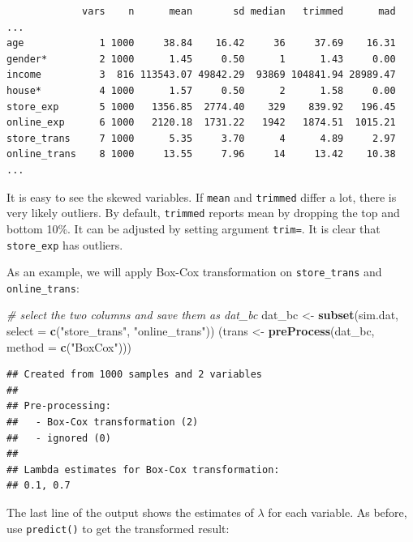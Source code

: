 \documentclass[12pt,]{krantz}
\makeatletter
\newenvironment{Shaded}{\begin{snugshade}}{\end{snugshade}}
\newcommand{\CommentTok}[1]{\textcolor[rgb]{0.37,0.37,0.37}{\textit{#1}}}
\newcommand{\DataTypeTok}[1]{\textcolor[rgb]{0.27,0.27,0.27}{#1}}
\newcommand{\KeywordTok}[1]{\textcolor[rgb]{0.27,0.27,0.27}{\textbf{#1}}}
\newcommand{\NormalTok}[1]{#1}
\newcommand{\StringTok}[1]{\textcolor[rgb]{0.5,0.5,0.5}{#1}}
\newenvironment{kframe}{%
\medskip{}
\setlength{\fboxsep}{.8em}
 \def\at@end@of@kframe{}%
 \ifinner\ifhmode%
  \def\at@end@of@kframe{\end{minipage}}%
  \begin{minipage}{\columnwidth}%
 \fi\fi%
 \def\FrameCommand##1{\hskip\@totalleftmargin \hskip-\fboxsep
 \colorbox{shadecolor}{##1}\hskip-\fboxsep
     \hskip-\linewidth \hskip-\@totalleftmargin \hskip\columnwidth}%
 \MakeFramed {\advance\hsize-\width
   \@totalleftmargin\z@ \linewidth\hsize
   \@setminipage}}%
 {\par\unskip\endMakeFramed%
 \at@end@of@kframe}
\renewenvironment{Shaded}{\begin{kframe}}{\end{kframe}}
\makeatother
\begin{document}
\begin{verbatim}
             vars    n      mean       sd median   trimmed      mad ...
age             1 1000     38.84    16.42     36     37.69    16.31
gender*         2 1000      1.45     0.50      1      1.43     0.00
income          3  816 113543.07 49842.29  93869 104841.94 28989.47
house*          4 1000      1.57     0.50      2      1.58     0.00
store_exp       5 1000   1356.85  2774.40    329    839.92   196.45
online_exp      6 1000   2120.18  1731.22   1942   1874.51  1015.21
store_trans     7 1000      5.35     3.70      4      4.89     2.97
online_trans    8 1000     13.55     7.96     14     13.42    10.38
...
\end{verbatim}

It is easy to see the skewed variables. If \texttt{mean} and \texttt{trimmed} differ a lot, there is very likely outliers. By default, \texttt{trimmed} reports mean by dropping the top and bottom 10\%. It can be adjusted by setting argument \texttt{trim=}. It is clear that \texttt{store\_exp} has outliers.

As an example, we will apply Box-Cox transformation on \texttt{store\_trans} and \texttt{online\_trans}:

\begin{Shaded}
\begin{Highlighting}[]
\CommentTok{# select the two columns and save them as dat_bc}
\NormalTok{dat_bc <-}\StringTok{ }\KeywordTok{subset}\NormalTok{(sim.dat, }\DataTypeTok{select =} \KeywordTok{c}\NormalTok{(}\StringTok{"store_trans"}\NormalTok{, }\StringTok{"online_trans"}\NormalTok{))}
\NormalTok{(trans <-}\StringTok{ }\KeywordTok{preProcess}\NormalTok{(dat_bc, }\DataTypeTok{method =} \KeywordTok{c}\NormalTok{(}\StringTok{"BoxCox"}\NormalTok{)))}
\end{Highlighting}
\end{Shaded}

\begin{verbatim}
## Created from 1000 samples and 2 variables
## 
## Pre-processing:
##   - Box-Cox transformation (2)
##   - ignored (0)
## 
## Lambda estimates for Box-Cox transformation:
## 0.1, 0.7
\end{verbatim}

The last line of the output shows the estimates of \(\lambda\) for each variable. As before, use \texttt{predict()} to get the transformed result:
\end{document}
